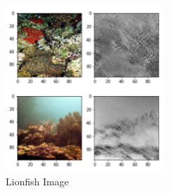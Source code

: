 \documentclass[12pt]{article}
\begin{document}
		\begin{figure}[ht]
			\begin{center}
				\includegraphics[width = 6cm]{lionfish}
			\end{center}
			\caption{Lionfish Image}
		\end{figure}
\end{document}
